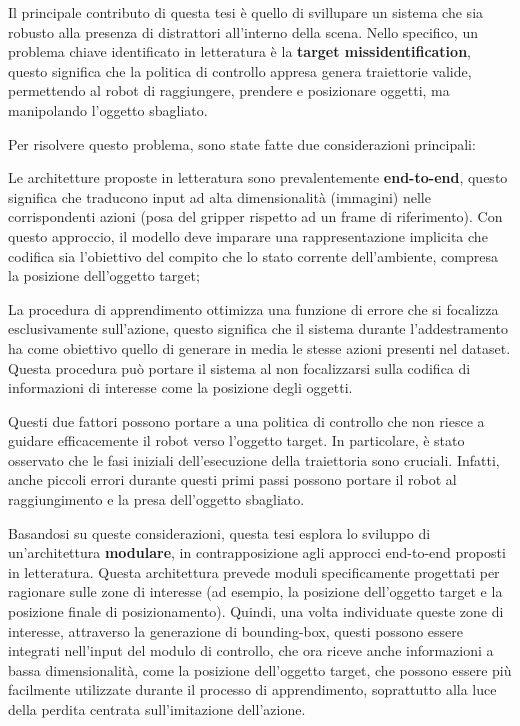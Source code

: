 Il principale contributo di questa tesi è quello di svillupare un sistema che sia robusto alla presenza di distrattori all'interno della scena. Nello specifico, un problema chiave identificato in letteratura è la \textbf{target missidentification}, questo significa che la politica di controllo appresa genera traiettorie valide, permettendo al robot di raggiungere, prendere e posizionare oggetti, ma manipolando l'oggetto sbagliato.

Per risolvere questo problema, sono state fatte due considerazioni principali:
\begin{enumerate*}[label=\textbf{(\arabic*)}] 
    \item Le architetture proposte in letteratura sono prevalentemente \textbf{end-to-end}, questo significa che traducono input ad alta dimensionalità (immagini) nelle corrispondenti azioni (posa del gripper rispetto ad un frame di riferimento). Con questo approccio, il modello deve imparare una rappresentazione implicita che codifica sia l'obiettivo del compito che lo stato corrente dell'ambiente, compresa la posizione dell'oggetto target;
    \item La procedura di apprendimento ottimizza una funzione di errore che si focalizza esclusivamente sull'azione, questo significa che il sistema durante l'addestramento ha come obiettivo quello di generare in media le stesse azioni presenti nel dataset. Questa procedura può portare il sistema al non focalizzarsi sulla codifica di informazioni di interesse come la posizione degli oggetti. 
\end{enumerate*}

Questi due fattori possono portare a una politica di controllo che non riesce a guidare efficacemente il robot verso l'oggetto target. In particolare, è stato osservato che le fasi iniziali dell'esecuzione della traiettoria sono cruciali. Infatti, anche piccoli errori durante questi primi passi possono portare il robot al raggiungimento e la presa dell'oggetto sbagliato.

Basandosi su queste considerazioni, questa tesi esplora lo sviluppo di un'architettura \textbf{modulare}, in contrapposizione agli approcci end-to-end proposti in letteratura. Questa architettura prevede moduli specificamente progettati per ragionare sulle zone di interesse (ad esempio, la posizione dell'oggetto target e la posizione finale di posizionamento). Quindi, una volta individuate queste zone di interesse, attraverso la generazione di bounding-box, questi possono essere integrati nell'input del modulo di controllo, che ora riceve anche informazioni a bassa dimensionalità, come la posizione dell'oggetto target, che possono essere più facilmente utilizzate durante il processo di apprendimento, soprattutto alla luce della perdita centrata sull'imitazione dell'azione.

